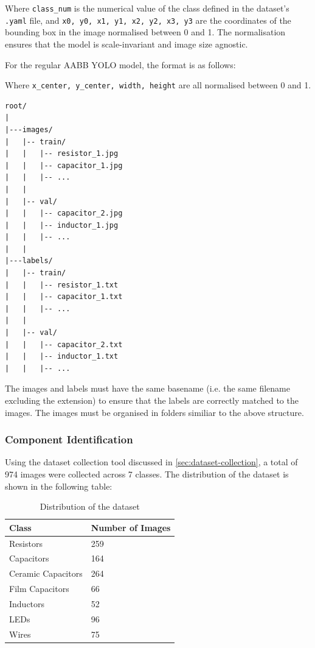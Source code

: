Where \texttt{class\_num} is the numerical value of the class defined in the dataset's \texttt{.yaml} file, and \texttt{x0, y0, x1, y1, x2, y2, x3, y3} are the coordinates of the bounding box in the image normalised between 0 and 1. The normalisation ensures that the model is scale-invariant and image size agnostic.

For the regular AABB YOLO model, the format is as follows:
\begin{center}
\end{center}

Where \texttt{x\_center, y\_center, width, height} are all normalised between 0 and 1.

\begin{minipage}[H]{\textwidth}
\begin{verbatim}
root/
|
|---images/
|   |-- train/
|   |   |-- resistor_1.jpg
|   |   |-- capacitor_1.jpg
|   |   |-- ...
|   |
|   |-- val/
|   |   |-- capacitor_2.jpg
|   |   |-- inductor_1.jpg
|   |   |-- ...
|   |
|---labels/
|   |-- train/
|   |   |-- resistor_1.txt
|   |   |-- capacitor_1.txt
|   |   |-- ...
|   |
|   |-- val/
|   |   |-- capacitor_2.txt
|   |   |-- inductor_1.txt
|   |   |-- ...
\end{verbatim}
\label{code:dataset-structure}
\end{minipage}

The images and labels must have the same basename (i.e. the same filename excluding the extension) to ensure that the labels are correctly matched to the images. The images must be organised in folders similiar to the above structure.

\subsubsection{Component Identification}
Using the dataset collection tool discussed in \autoref{sec:dataset-collection}, a total of 974 images were collected across 7 classes. The distribution of the dataset is shown in the following table:
\begin{table}[H]
  \centering
  \begin{tabularx}{0.5\textwidth}{|X|X|}
    \hline
    \textbf{Class} & \textbf{Number of Images} \\
    \hline
    Resistors & 259 \\
    \hline
    Capacitors & 164 \\
    \hline
    Ceramic Capacitors & 264 \\
    \hline
    Film Capacitors & 66 \\
    \hline
    Inductors & 52 \\
    \hline
    LEDs & 96 \\
    \hline
    Wires & 75 \\
    \hline
  \end{tabularx}
  \caption{Distribution of the dataset}
  \label{tab:dataset-distribution}
\end{table}

